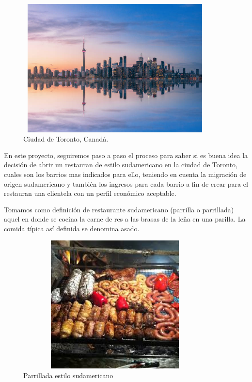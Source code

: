 \documentclass[10pt,a4paper,arial, spanish]{article}
\begin{document}
\begin{figure}[H]
	\centering
	\includegraphics[width=10cm, height=7cm]{Toronto}
	\caption[Ciudad de Toronto]{Ciudad de Toronto, Canadá.}
	\label{fig:toronto}
\end{figure}


En este proyecto, seguiremos paso a paso el proceso para saber si es buena idea la decisión de abrir un restauran de estilo sudamericano en la ciudad de Toronto, cuales son los barrios mas indicados para ello, teniendo en cuenta la migración de origen sudamericano y también los ingresos para cada barrio a fin de  crear para el restauran una clientela con un perfil económico aceptable.

Tomamos como definición de restaurante sudamericano (parrilla o parrillada) aquel en donde se cocina la carne de res a las brasas de la leña en una parilla. La comida típica así definida se denomina asado.

\begin{figure}[h]
	\centering
	\includegraphics[width=10cm, height=7cm]{parrillada}
	\caption[Parrillada estilo sudamericano]{Parrillada estilo sudamericano}
	\label{fig:parrillada}
\end{figure}
\end{document}
